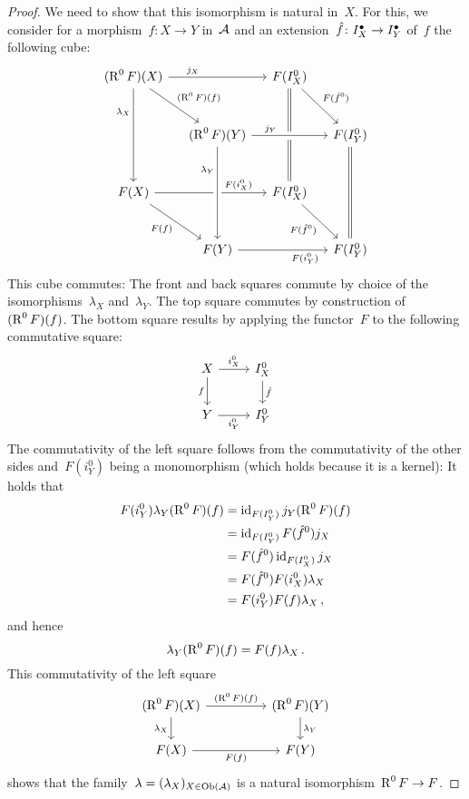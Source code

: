 \begin{proof}
  We need to show that this isomorphism is natural in~$X$.
  For this, we consider for a morphism~$f \colon X \to Y$ in~$\mathcal{A}$ and an extension~$\hat{f} \colon I^\bullet_X \to I^\bullet_Y$ of~$f$ the following cube:
  \[
    \begin{tikzcd}[row sep = large, column sep = small]
        (\Right^0 F)(X)
        \arrow{rr}[above, near start]{j_X}
        \arrow{dr}[above right]{(\Right^0 F)(f)}
        \arrow{dd}[left, near start]{\lambda_X}
      & {}
      & F(I^0_X)
        \arrow{dr}[above right]{F(\hat{f}^0)}
        \arrow[equal]{dd}
      & {}
      \\
        {}
      & (\Right^0 F)(Y)
      & {}
      & F(I^0_Y)
        \arrow[from=ll, crossing over, "j_Y", near start]
        \arrow[equal]{dd}
      \\
        F(X)
        \arrow{rr}[above, near end]{F(i^0_X)}
        \arrow{dr}[below left]{F(f)}
      & {}
      & F(I^0_X)
        \arrow{dr}[below left]{F(\hat{f}^0)}
      & {}
      \\
        {}
      & F(Y)
        \arrow[from=uu, crossing over, "\lambda_Y", swap, near start]
        \arrow{rr}[below, near end]{F(i^0_Y)}
      & {}
      & F(I^0_Y)
    \end{tikzcd}
  \]
  This cube commutes:
  The front and back squares commute by choice of the isomorphisms~$\lambda_X$ and~$\lambda_Y$.
  The top square commutes by construction of~$(\operatorname{R}^0 F)(f)$.
  The bottom square results by applying the functor~$F$ to the following commutative square:
  \[
    \begin{tikzcd}
        X
        \arrow{r}[above]{i^0_X}
        \arrow{d}[left]{f}
      & I^0_X
        \arrow{d}[right]{\hat{f}}
      \\
        Y
        \arrow{r}[below]{i^0_Y}
      & I^0_Y
    \end{tikzcd}
  \]
  The commutativity of the left square follows from the commutativity of the other sides and~$F(i^0_Y)$ being a monomorphism (which holds because it is a kernel):
  It holds that
  \begin{align*}
        F(i^0_Y) \lambda_Y (\operatorname{R}^0 F)(f)
    &=  \operatorname{id}_{F(I^0_Y)} j_Y (\operatorname{R}^0 F)(f)  \\
    &=  \operatorname{id}_{F(I^0_Y)} F(\hat{f}^0) j_X \\
    &=  F(\hat{f}^0) \operatorname{id}_{F(I^0_X)} j_X \\
    &=  F(\hat{f}^0) F(i^0_X) \lambda_X \\
    &=  F(i^0_Y) F(f) \lambda_X \,,
  \end{align*}
  and hence
  \[
      \lambda_Y (\operatorname{R}^0 F)(f)
    = F(f) \lambda_X  \,.
  \]
  This commutativity of the left square
  \[
    \begin{tikzcd}[column sep = huge]
        (\Right^0 F)(X)
        \arrow{r}[above]{(\Right^0 F)(f)}
        \arrow{d}[left]{\lambda_X}
      & (\Right^0 F)(Y)
        \arrow{d}[right]{\lambda_Y}
      \\
        F(X)
        \arrow{r}[below]{F(f)}
      & F(Y)
    \end{tikzcd}
  \]
  shows that the family~$\lambda = (\lambda_X)_{X \in \operatorname{Ob}(\mathcal{A})}$ is a natural isomorphism~$\operatorname{R}^0 F \to F$.
\end{proof}


